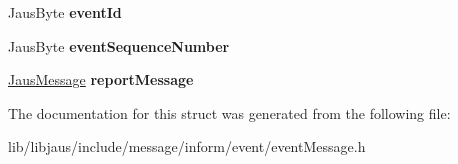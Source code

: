 \begin{DoxyCompactItemize}
\item 
\hypertarget{struct_event_message_struct_a62d62b4a3e091f495d17ab1aff1d004d}{\-Jaus\-Byte {\bfseries event\-Id}}\label{struct_event_message_struct_a62d62b4a3e091f495d17ab1aff1d004d}

\item 
\hypertarget{struct_event_message_struct_aadf740ff5dedd4d09fbcc9ddbf011161}{\-Jaus\-Byte {\bfseries event\-Sequence\-Number}}\label{struct_event_message_struct_aadf740ff5dedd4d09fbcc9ddbf011161}

\item 
\hypertarget{struct_event_message_struct_a72f85ba425ee2a811e8ae9dc192cbf4c}{\hyperlink{struct_jaus_message_struct}{\-Jaus\-Message} {\bfseries report\-Message}}\label{struct_event_message_struct_a72f85ba425ee2a811e8ae9dc192cbf4c}

\end{DoxyCompactItemize}


\-The documentation for this struct was generated from the following file\-:\begin{DoxyCompactItemize}
\item 
lib/libjaus/include/message/inform/event/event\-Message.\-h\end{DoxyCompactItemize}
